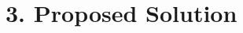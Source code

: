 \documentclass[11pt, a4paper, twoside, openright]{report}
\begin{document}
%
%
%
%


\section*{3. Proposed Solution}


%
\end{document}
